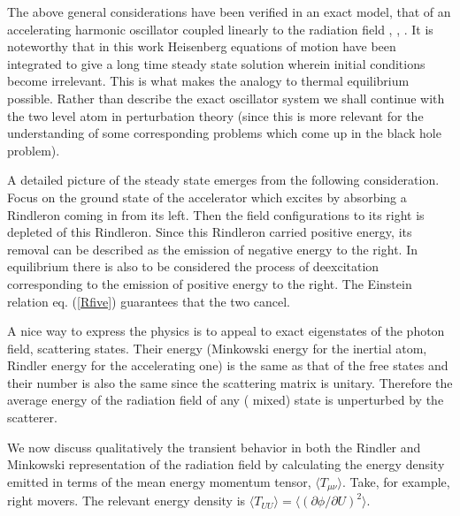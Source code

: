 \documentclass[12pt,oneside]{report}
\begin{document}
The above general considerations have been verified in an exact model, that
of an accelerating harmonic oscillator coupled linearly to the radiation
field \cite{RSG}, \cite{Unru2},  \cite{MPB}. It is noteworthy that in this work
Heisenberg equations of motion have been integrated to give a long time steady
state solution wherein initial conditions become irrelevant. This is what makes
the analogy to thermal equilibrium possible.
Rather than describe the exact oscillator system we
shall continue with the two level atom in perturbation theory (since this
is more relevant for the understanding of some corresponding problems which
come up in the black hole problem).

A detailed picture of the steady state emerges from the following
consideration. Focus on the ground state of the accelerator which excites
by absorbing a Rindleron coming in from its left. Then the field
configurations  to its right is depleted of this Rindleron. Since this
Rindleron carried positive energy, its removal  can be described as the
emission of  negative energy to the right. In equilibrium there is also to be
considered the process of deexcitation corresponding to the emission of
positive energy   to the right. The Einstein relation eq. (\ref{Rfive})
guarantees that the two cancel. 

A nice way to express the physics is to appeal to exact
eigenstates of the photon field, scattering states. Their energy (Minkowski
energy for the inertial atom, Rindler energy for the accelerating one) is
the same as that of the free states and their number is also the same since
the scattering matrix is unitary.  Therefore the average energy of the
radiation field of any ( mixed) state is unperturbed by the scatterer.

We now discuss qualitatively the transient behavior in both the Rindler
and Minkowski representation of the radiation field by calculating the
energy density emitted in terms of the mean energy momentum tensor, $\langle
T_{\mu \nu} \rangle$. Take, for example, right movers. The relevant energy
density is  $\langle T_{UU} \rangle = \langle (\partial \phi / \partial U)^2
\rangle $.
\end{document}
